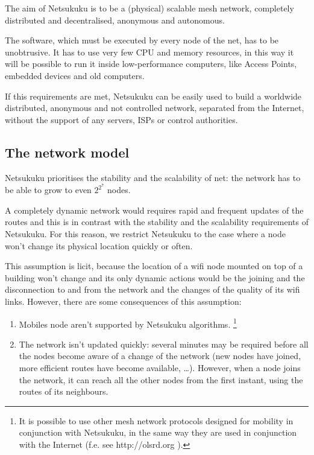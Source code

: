 \documentclass[a4paper]{article}
\newcommand{\href}[2]{ #1 }
\begin{document}
The aim of Netsukuku is to be a (physical) scalable mesh network, completely
distributed and decentralised, anonymous and autonomous.

The software, which must be executed by every node of the net, has to be
unobtrusive. It has to use very few CPU and memory resources, in this way it
will be possible to run it inside low-performance computers, like Access Points,
embedded devices and old computers.

If this requirements are met, Netsukuku can be easily used to build a worldwide
distributed, anonymous and not controlled network, separated from the
Internet, without the support of any servers, ISPs or control authorities.

\subsection{The network model}
\label{sec:net_model}

Netsukuku prioritises the stability and the scalability of net: the network
has to be able to grow to even $2^{2^7}$ nodes.

A completely dynamic network would requires rapid and frequent updates
of the routes and this is in contrast with the stability and the scalability
requirements of Netsukuku.
For this reason, we restrict Netsukuku to the case where a node won't change
its physical location quickly or often.

This assumption is licit, because the location of a wifi node mounted on
top of a building won't change and its only dynamic actions would be the
joining and the disconnection to and from the network and the changes of the
quality of its wifi links.
However, there are some consequences of this assumption:
\begin{enumerate}
	\item	Mobiles node aren't supported by Netsukuku algorithms.
		\footnote{It is possible to use other mesh network protocols
		designed for mobility in conjunction with Netsukuku, in the
		same way they are used in conjunction
		with the Internet (f.e. see \href{http://olsrd.org}{olsrd}). }
	\item   The network isn't updated quickly: several minutes may be
		required before all the nodes become aware of a change of the
		network (new nodes have joined, more efficient routes have
		become available, \dots). However, when a node joins
		the network, it can reach all the other nodes from the first
		instant, using the routes of its neighbours.
\end{enumerate}
\end{document}
